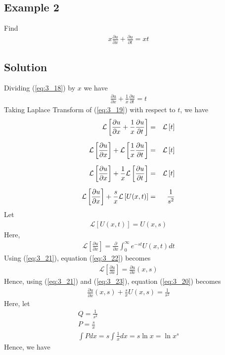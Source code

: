 \documentclass[11pt]{report}
\newcommand{\sps}{\\[0.2cm]}
\newcommand{\refn}[1]{(\ref{#1})}
\newcommand{\refx}[1]{\refn{eq:#1}}
\newcommand{\Laplace}{\mathcal{L}}
\newcommand{\sbracket}[1]{\left[#1\right]}
\newcommand{\LFn}[1]{\Laplace \sbracket{#1}}
\newcommand{\Lpt}{Laplace Transform }
\begin{document}
	\subsection*{Example 2}
	Find
	\begin{eqnarray}
		x\frac{\partial u}{\partial x} + \frac{\partial u}{\partial t} = xt\label{eq:3_18}
	\end{eqnarray}
	
	\subsection*{Solution}
	Dividing \refx{3_18} by $x$ we  have
	\begin{eqnarray}
		\frac{\partial u}{\partial x} + \frac{1}{x}\frac{\partial u}{\partial t} = t\label{eq:3_19}
	\end{eqnarray}
	Taking \Lpt of \refx{3_19} with respect to $t$, we have
	\begin{eqnarray}
		\LFn{\frac{\partial u}{\partial x} + \frac{1}{x}\frac{\partial u}{\partial t}} &=& \LFn{t}\notag\sps
		\LFn{\frac{\partial u}{\partial x}} + \LFn{\frac{1}{x}\frac{\partial u}{\partial t}} &=& \LFn{t}\notag\sps
		\LFn{\frac{\partial u}{\partial x}} + \frac{1}{x}\LFn{\frac{\partial u}{\partial t}} &=& \LFn{t}\notag\sps
		\LFn{\frac{\partial u}{\partial x}} + \frac{s}{x}\LFn{U(x,t)} &=& \frac{1}{s^2}\label{eq:3_20}
	\end{eqnarray}
	Let
	\begin{eqnarray}
		\LFn{U(x,t)} = U(x,s)\label{eq:3_21}
	\end{eqnarray}
	Here,
	\begin{eqnarray}
		\LFn{\frac{\partial u}{\partial x}} = \frac{\partial}{\partial x}\int_0^\infty e^{-st}U(x,t)dt\label{eq:3_22}
	\end{eqnarray}
	Using \refx{3_21}, equation \refx{3_22} becomes
	\begin{eqnarray}
		\LFn{\frac{\partial u}{\partial x}} = \frac{\partial u}{\partial x}(x,s)\label{eq:3_23}
	\end{eqnarray}
	Hence, using \refx{3_21} and \refx{3_23}, equation \refx{3_20} becomes
	\begin{eqnarray}
		\frac{\partial u}{\partial x}(x,s) + \frac{s}{x}U(x,s) = \frac{1}{s^2}\label{eq:3_24}
	\end{eqnarray}
	Here, let
	\begin{gather*}
		Q = \frac{1}{s^2}\sps
		P = \frac{s}{x} \sps
		\int Pdx = s\int\frac{1}{x}dx = s\ln x = \ln x^s
	\end{gather*}
	Hence, we have
\end{document}
